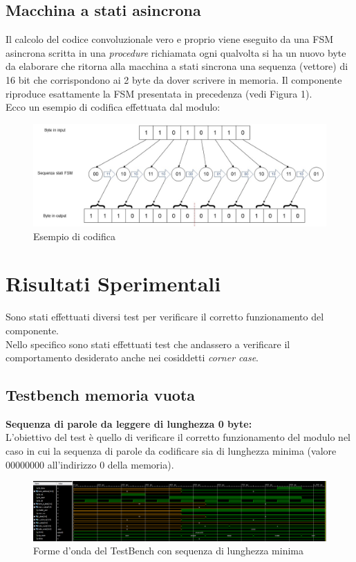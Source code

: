 \documentclass{article}
\begin{document}
\subsection{Macchina a stati asincrona}
Il calcolo del codice convoluzionale vero e proprio viene eseguito da una FSM asincrona scritta in una \textit{procedure} richiamata ogni qualvolta si ha un nuovo byte da elaborare che ritorna alla macchina a stati sincrona una sequenza (vettore) di 16 bit che corrispondono ai 2 byte da dover scrivere in memoria.
Il componente riproduce esattamente la FSM presentata in precedenza (vedi Figura 1).\\
Ecco un esempio di codifica effettuata dal modulo:
\\
\begin{figure}[h]
\centerline{\includegraphics[scale=0.5]{seq_stati_es.jpg}}
\centering
\caption{Esempio di codifica}
\centering
\end{figure}

\clearpage
\section{Risultati Sperimentali}
Sono stati effettuati diversi test per verificare il corretto funzionamento del componente.\\
Nello specifico sono stati effettuati test che andassero a verificare il comportamento desiderato anche nei cosiddetti \textit{corner case}.

\subsection{Testbench memoria vuota}
\textbf{Sequenza di parole da leggere di lunghezza 0 byte:}\\
L'obiettivo del test è quello di verificare il corretto funzionamento del modulo nel caso in cui la sequenza di parole da codificare sia di lunghezza minima (valore $00000000$ all'indirizzo $0$ della memoria).

\begin{figure}[H]
\centerline{\includegraphics[scale=0.35]{tb_seq_min.PNG}}
\centering
\caption{Forme d'onda del TestBench con sequenza di lunghezza minima}
\centering
\end{figure}
\end{document}
